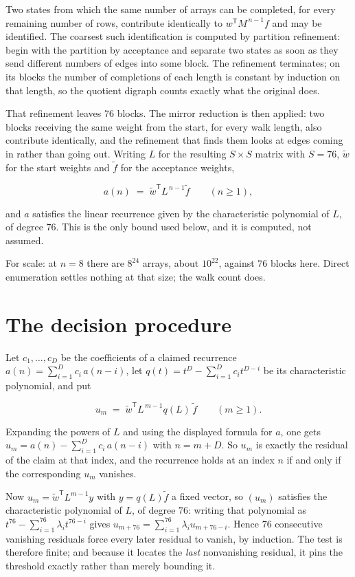 \documentclass[11pt]{article}
\theoremstyle{definition}
\begin{document}
Two states from which the same number of arrays can be completed, for every remaining number of rows, contribute identically to $w^{\mathsf T}M^{\,n-1}f$ and may be identified. The coarsest such identification is computed by partition refinement: begin with the partition by acceptance and separate two states as soon as they send different numbers of edges into some block. The refinement terminates; on its blocks the number of completions of each length is constant by induction on that length, so the quotient digraph counts exactly what the original does.

That refinement leaves $76$ blocks. The mirror reduction is then applied: two blocks receiving the same weight from the start, for every walk length, also contribute identically, and the refinement that finds them looks at edges coming in rather than going out. Writing $L$ for the resulting $S \times S$ matrix with $S = 76$, $\tilde w$ for the start weights and $\tilde f$ for the acceptance weights,

\[a(n) \;=\; \tilde w^{\mathsf T} L^{\,n-1} \tilde f \qquad (n \ge 1),\]

and $a$ satisfies the linear recurrence given by the characteristic polynomial of $L$, of degree $76$. This is the only bound used below, and it is computed, not assumed.

For scale: at $n = 8$ there are $8^{24}$ arrays, about $10^{22}$, against $76$ blocks here. Direct enumeration settles nothing at that size; the walk count does.

\section{The decision procedure}

Let $c_1,\dots,c_D$ be the coefficients of a claimed recurrence $a(n) = \sum_{i=1}^{D} c_i\,a(n-i)$, let $q(t) = t^{D} - \sum_{i=1}^{D} c_i t^{D-i}$ be its characteristic polynomial, and put

\[u_m \;=\; \tilde w^{\mathsf T} L^{\,m-1} q(L)\,\tilde f \qquad (m \ge 1).\]

Expanding the powers of $L$ and using the displayed formula for $a$, one gets $u_m = a(n) - \sum_{i=1}^{D} c_i\,a(n-i)$ with $n = m + D$. So $u_m$ is exactly the residual of the claim at that index, and the recurrence holds at an index $n$ if and only if the corresponding $u_m$ vanishes.

Now $u_m = \tilde w^{\mathsf T} L^{m-1} y$ with $y = q(L)\tilde f$ a fixed vector, so $(u_m)$ satisfies the characteristic polynomial of $L$, of degree $76$: writing that polynomial as $t^{76} - \sum_{i=1}^{76} \lambda_i t^{76-i}$ gives $u_{m+76} = \sum_{i=1}^{76} \lambda_i u_{m+76-i}$. Hence $76$ consecutive vanishing residuals force every later residual to vanish, by induction. The test is therefore finite; and because it locates the {\itshape last} nonvanishing residual, it pins the threshold exactly rather than merely bounding it.
\end{document}

